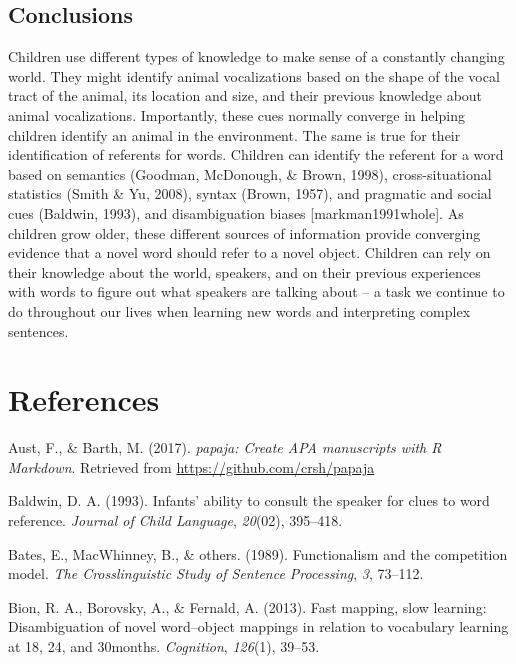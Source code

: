 \documentclass[english,floatsintext,man]{apa6}
\theoremstyle{definition}
\theoremstyle{definition}
\theoremstyle{definition}
\theoremstyle{remark}
\begin{document}
\hypertarget{conclusions}{%
\subsection{Conclusions}\label{conclusions}}

Children use different types of knowledge to make sense of a constantly
changing world. They might identify animal vocalizations based on the
shape of the vocal tract of the animal, its location and size, and their
previous knowledge about animal vocalizations. Importantly, these cues
normally converge in helping children identify an animal in the
environment. The same is true for their identification of referents for
words. Children can identify the referent for a word based on semantics
(Goodman, McDonough, \& Brown, 1998), cross-situational statistics
(Smith \& Yu, 2008), syntax (Brown, 1957), and pragmatic and social cues
(Baldwin, 1993), and disambiguation biases {[}markman1991whole{]}. As
children grow older, these different sources of information provide
converging evidence that a novel word should refer to a novel object.
Children can rely on their knowledge about the world, speakers, and on
their previous experiences with words to figure out what speakers are
talking about -- a task we continue to do throughout our lives when
learning new words and interpreting complex sentences.

\newpage

\hypertarget{references}{%
\section{References}\label{references}}

\setlength{\parindent}{-0.5in}
\setlength{\leftskip}{0.5in}

\hypertarget{refs}{}
\leavevmode\hypertarget{ref-R-papaja}{}%
Aust, F., \& Barth, M. (2017). \emph{papaja: Create APA manuscripts with
R Markdown}. Retrieved from \url{https://github.com/crsh/papaja}

\leavevmode\hypertarget{ref-baldwin1993infants}{}%
Baldwin, D. A. (1993). Infants' ability to consult the speaker for clues
to word reference. \emph{Journal of Child Language}, \emph{20}(02),
395--418.

\leavevmode\hypertarget{ref-bates1989functionalism}{}%
Bates, E., MacWhinney, B., \& others. (1989). Functionalism and the
competition model. \emph{The Crosslinguistic Study of Sentence
Processing}, \emph{3}, 73--112.

\leavevmode\hypertarget{ref-bion2013fast}{}%
Bion, R. A., Borovsky, A., \& Fernald, A. (2013). Fast mapping, slow
learning: Disambiguation of novel word--object mappings in relation to
vocabulary learning at 18, 24, and 30months. \emph{Cognition},
\emph{126}(1), 39--53.
\end{document}
